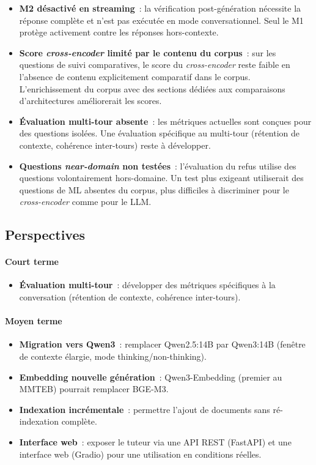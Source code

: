 \documentclass[11pt,a4paper]{article}
\begin{document}
\begin{itemize}
  \item \textbf{M2 désactivé en streaming}~: la vérification post-génération nécessite la réponse complète et n'est pas exécutée en mode conversationnel. Seul le M1 protège activement contre les réponses hors-contexte.



  \item \textbf{Score \textit{cross-encoder} limité par le contenu du corpus}~: sur les questions de suivi comparatives, le score du \textit{cross-encoder} reste faible en l'absence de contenu explicitement comparatif dans le corpus. L'enrichissement du corpus avec des sections dédiées aux comparaisons d'architectures améliorerait les scores.

  \item \textbf{Évaluation multi-tour absente}~: les métriques actuelles sont conçues pour des questions isolées. Une évaluation spécifique au multi-tour (rétention de contexte, cohérence inter-tours) reste à développer.

  \item \textbf{Questions \textit{near-domain} non testées}~: l'évaluation du refus utilise des questions volontairement hors-domaine. Un test plus exigeant utiliserait des questions de ML absentes du corpus, plus difficiles à discriminer pour le \textit{cross-encoder} comme pour le LLM.
\end{itemize}

\subsection{Perspectives}

\paragraph{Court terme}

\begin{itemize}
  \item \textbf{Évaluation multi-tour}~: développer des métriques spécifiques à la conversation (rétention de contexte, cohérence inter-tours).
\end{itemize}

\paragraph{Moyen terme}

\begin{itemize}
  \item \textbf{Migration vers Qwen3}~: remplacer Qwen2.5:14B par Qwen3:14B (fenêtre de contexte élargie, mode thinking/non-thinking).
  \item \textbf{Embedding nouvelle génération}~: Qwen3-Embedding (premier au MMTEB) pourrait remplacer BGE-M3.
  \item \textbf{Indexation incrémentale}~: permettre l'ajout de documents sans ré-indexation complète.
  \item \textbf{Interface web}~: exposer le tuteur via une API REST (FastAPI) et une interface web (Gradio) pour une utilisation en conditions réelles.
\end{itemize}
\end{document}
